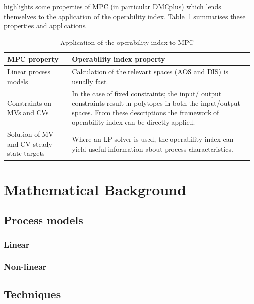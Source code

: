 \citet{vinsonphd} highlights some properties of MPC (in particular DMCplus)
which lends themselves to the  application of the operability index. 
Table~\ref{tab:mpcoi} summarises these properties and applications.
\begin{table}[htbp]
  \centering
  \caption[Application of the operability index to MPC]{Application of the
    operability index to MPC \citep{vinsonphd}}
  \label{tab:mpcoi}
    \begin{tabular}{p{6cm} p{9cm}}
      \toprule
      MPC property & Operability index property \\
      \midrule
      Linear process models & Calculation of the relevant spaces (AOS and DIS)
                              is usually fast.\\
      Constraints on MVs and 
      CVs                   & In the case of fixed constraints; the input/
                              output constraints result in polytopes in both
                              the input/output spaces. From these descriptions
                              the framework of operability index can be directly
                              applied.\\
      Solution of MV and CV 
      steady state targets  & Where an LP solver is used, the operability index
                              can yield useful information about process
                              characteristics.\\
      \bottomrule
    \end{tabular}
\end{table}

\section{Mathematical Background}
\subsection{Process models}
\subsubsection{Linear}
\subsubsection{Non-linear}
\subsection{Techniques}
